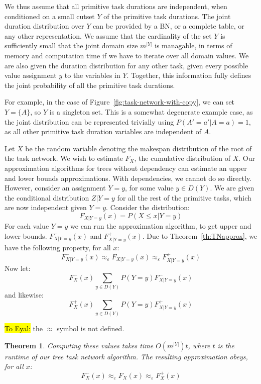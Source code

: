 \documentclass{article}
\newtheorem{theorem}{Theorem}
\begin{document}
We thus assume that all primitive task durations are independent, when conditioned on
a small cutset $Y$ of the primitive task durations. The joint duration distribution over $Y$
can be provided by a BN, or a complete table, or any other representation. We assume
that the cardinality of the set $Y$ is sufficiently small that the joint domain
size $m^{|Y|}$ is managable, in terms of memory and computation time if we have to
iterate over all domain values. We are also given the duration distribution for any
other task, given every possible value assignment $y$ to the variables in $Y$.
Together, this information fully defines the joint probability of all the 
primitive task durations. 

For example, in the case of Figure~\ref{fig:task-network-with-copy}, we can set $Y=\{ A\}$, so $Y$ is a singleton set.
This is a somewhat degenerate example case, as
the joint distribution can be represented trivially using $P(A'=a'|A=a)=1$,
as  all other primitive task duration variables are independent of $A$.

Let $X$ be the random variable denoting the makespan distribution of the
root of the task network. We wish to estimate $F_X$, the cumulative distribution of $X$.
Our approximation algorithms for trees without dependency can estimate an
upper and lower bounds approximations. With dependencies, we cannot do so directly.
However, consider an assignment $Y=y$, for some value $y\in D(Y)$. We are given the conditional
distribution $Z|Y=y$ for all the rest of the primitive tasks, which are now
independent given $Y=y$. Consider the distribution:
\[
F_{X|Y=y}(x) = P(X\leq x| Y=y)
\]
For each value $Y=y$ we can run the approximation algorithm, to get upper and lower bounds.
$F^-_{X|Y=y}(x)$ and  $F^+_{X|Y=y}(x)$. Due to Theorem~\ref{th:TNapprox}, we have
the following property, for all $x$:
\[
F^-_{X|Y=y}(x) \approx _\varepsilon F_{X|Y=y}(x) \approx _\varepsilon F^+_{X|Y=y}(x)
\]
Now let:
\[
F^-_{X}(x) \sum_{y\in D(Y)} P(Y=y) F^-_{X|Y=y}(x)
\]
and likewise:
\[
F^+_{X}(x) \sum_{y\in D(Y)} P(Y=y) F^+_{X|Y=y}(x)
\]

\hl{To Eyal:} the $\approx$ symbol is not defined.

\begin{theorem}
Computing these values takes time $O(m^{|Y|})t$, where $t$ is the runtime
of our tree task network algorithm. The resulting approximation obeys, for all $x$:
\[
F^-_{X}(x) \approx _\varepsilon F_{X}(x) \approx _\varepsilon F^+_{X}(x)
\]
\end{theorem}
\end{document}
